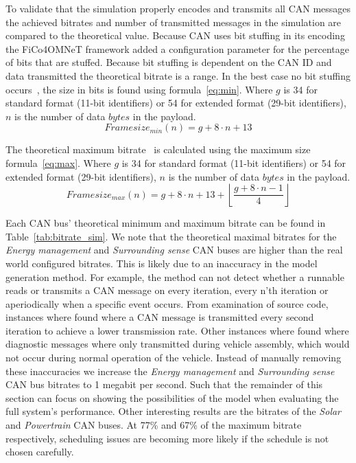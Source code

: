 To validate that the simulation properly encodes and transmits all CAN messages the achieved bitrates and number of transmitted messages in the simulation are compared to the theoretical value. Because CAN uses bit stuffing in its encoding the FiCo4OMNeT framework added a configuration parameter for the percentage of bits that are stuffed. Because bit stuffing is dependent on the CAN ID and data transmitted the theoretical bitrate is a range. In the best case no bit stuffing occurs~\cite{davis2007controller}, the size in bits is found using formula~\ref{eq:min}. Where $g$ is 34 for standard format (11-bit identifiers) or 54 for extended format (29-bit identifiers), $n$ is the number of data $bytes$ in the payload.
\begin{equation}
    \label{eq:min}
    Framesize_{min}(n) = g+8\cdot n + 13
\end{equation}

The theoretical maximum bitrate~\cite{davis2007controller} is calculated using the maximum size formula~\ref{eq:max}. Where $g$ is 34 for standard format (11-bit identifiers) or 54 for extended format (29-bit identifiers), $n$ is the number of data $bytes$ in the payload.
\begin{equation}
    \label{eq:max}
Framesize_{max}(n) = g +8\cdot n +13 +\left\lfloor\frac{g+8\cdot n-1}{4}\right\rfloor
\end{equation}

Each CAN bus' theoretical minimum and maximum bitrate can be found in Table~\ref{tab:bitrate_sim}. We note that the theoretical maximal bitrates for the \textit{Energy management} and \textit{Surrounding sense} CAN buses are higher than the real world configured bitrates. This is likely due to an inaccuracy in the model generation method. For example, the method can not detect whether a runnable reads or transmits a CAN message on every iteration, every n'th iteration or aperiodically when a specific event occurs. From examination of source code, instances where found where a CAN message is transmitted every second iteration to achieve a lower transmission rate. Other instances where found where diagnostic messages where only transmitted during vehicle assembly, which would not occur during normal operation of the vehicle. Instead of manually removing these inaccuracies we increase the \textit{Energy management} and \textit{Surrounding sense} CAN bus bitrates to 1 megabit per second. Such that the remainder of this section can focus on showing the possibilities of the model when evaluating the full system's performance. Other interesting results are the bitrates of the \textit{Solar} and \textit{Powertrain} CAN buses. At 77\% and 67\% of the maximum bitrate respectively, scheduling issues are becoming more likely if the schedule is not chosen carefully.

